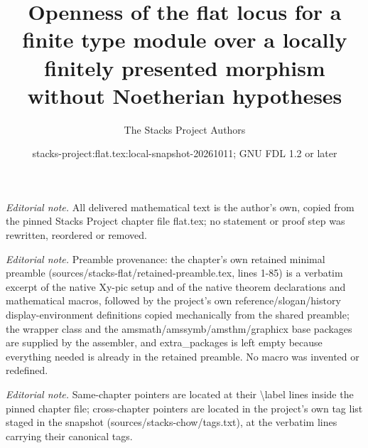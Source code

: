 \documentclass[10pt,a4paper]{amsart}
\title{Openness of the flat locus for a finite type module over a locally finitely presented morphism without Noetherian hypotheses}
\author{The Stacks Project Authors}
\date{stacks-project:flat.tex:local-snapshot-20261011; GNU FDL 1.2 or later}
\theoremstyle{plain}
\theoremstyle{definition}
\theoremstyle{remark}
\numberwithin{equation}{subsection}
\begin{document}
\maketitle
\noindent\textit{Editorial note.} All delivered mathematical text is the author's own, copied from the pinned Stacks Project chapter file flat.tex; no statement or proof step was rewritten, reordered or removed.\par\medskip
\noindent\textit{Editorial note.} Preamble provenance: the chapter's own retained minimal preamble (sources/stacks-flat/retained-preamble.tex, lines 1-85) is a verbatim excerpt of the native Xy-pic setup and of the native theorem declarations and mathematical macros, followed by the project's own reference/slogan/history display-environment definitions copied mechanically from the shared preamble; the wrapper class and the amsmath/amssymb/amsthm/graphicx base packages are supplied by the assembler, and extra\_packages is left empty because everything needed is already in the retained preamble. No macro was invented or redefined.\par\medskip
\noindent\textit{Editorial note.} Same-chapter pointers are located at their \textbackslash{}label lines inside the pinned chapter file; cross-chapter pointers are located in the project's own tag list staged in the snapshot (sources/stacks-chow/tags.txt), at the verbatim lines carrying their canonical tags.\par\medskip
\end{document}
